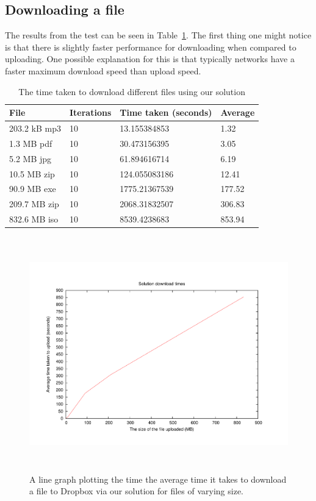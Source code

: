 \documentclass[12pt, titlepage]{article}
\begin{document}
\subsection{Downloading a file}
The results from the test can be seen in Table~\ref{tab:downloadBenchmark}. The first thing one might notice is that there is slightly faster performance for downloading when compared to uploading. One possible explanation for this is that typically networks have a faster maximum download speed than upload speed.


\bigskip
\begin{table}[h]
\begin{center}
    \begin{tabular}{ | l | l | l | l |}
    \hline
    \textbf{File} & \textbf{Iterations} & \textbf{Time taken (seconds)} & \textbf{Average} \\ \hline
    203.2 kB mp3 & 10 & 13.155384853 & 1.32 \\ \hline
    1.3 MB pdf  & 10 & 30.473156395 & 3.05 \\ \hline
    5.2 MB jpg & 10 & 61.894616714 & 6.19 \\ \hline
    10.5 MB zip & 10 & 124.055083186 & 12.41 \\ \hline
    90.9 MB exe & 10 & 1775.21367539  & 177.52 \\ \hline
    209.7 MB zip & 10 & 2068.31832507 & 306.83 \\ \hline
    832.6 MB iso & 10 & 8539.4238683 & 853.94 \\ \hline
    \end{tabular}
    \caption{The time taken to download different files using our solution} \label{tab:downloadBenchmark}
    \end{center}
    \end{table}
\bigskip

\begin{figure}[!t]
\centerline{\includegraphics[height=4.0in,width=7in,angle=0]{plots/solutionDownload/solutionDownloadTimes.pdf}}
\caption{A line graph plotting the time the average time it takes to download a file to Dropbox via our solution for files of varying size.}
\label{fig:dropboxDownloadLineGraph}
\end{figure}
\end{document}
